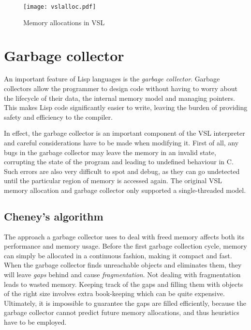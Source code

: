 
\begin{figure}[H]
    \centering
    \texttt{[image: vslalloc.pdf]}
    \label{fig:vslalloc}
    \caption{Memory allocations in VSL}
\end{figure}

\section{Garbage collector}
An important feature of Lisp languages is the \emph{garbage collector}. Garbage collectors allow the programmer
to design code without having to worry about the lifecycle of their data, the internal memory model and
managing pointers. This makes Lisp code significantly easier to write, leaving the burden of providing safety and
efficiency to the compiler.

In effect, the garbage collector is an important component of the VSL interpreter and careful considerations
have to be made when modifying it. First of all, any bugs in the garbage collector may leave the memory in
an invalid state, corrupting the state of the program and leading to undefined behaviour in C. Such errors
are also very difficult to spot and debug, as they can go undetected until the particular region of memory
is accessed again. The original VSL memory allocation and garbage collector only supported a single-threaded model.

\subsection{Cheney's algorithm}
The approach a garbage collector uses to deal with freed memory affects both its performance and memory usage.
Before the first garbage collection cycle, memory can simply be allocated in a continuous fashion, making it
compact and fast. When the garbage collector finds unreachable objects and eliminates them, they will leave \emph{gaps} behind
and cause \emph{fragmentation}. Not dealing with fragmentation leads to wasted memory. Keeping track of the gaps
and filling them with objects of the right size involves extra book-keeping which can be quite expensive. Ultimately,
it is impossible to guarantee the gaps are filled efficiently, because the garbage collector cannot predict future
memory allocations, and thus heuristics have to be employed.

